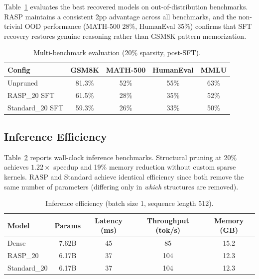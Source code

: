 \documentclass[11pt]{article}
\begin{document}
Table~\ref{tab:extended} evaluates the best recovered models on out-of-distribution benchmarks.
RASP maintains a consistent 2pp advantage across all benchmarks, and the non-trivial OOD performance (MATH-500 28\%, HumanEval 35\%) confirms that SFT recovery restores genuine reasoning rather than GSM8K pattern memorization.

\begin{table}[t]
\centering
\caption{Multi-benchmark evaluation (20\% sparsity, post-SFT).}
\label{tab:extended}
\begin{tabular}{lcccc}
\toprule
\textbf{Config} & \textbf{GSM8K} & \textbf{MATH-500} & \textbf{HumanEval} & \textbf{MMLU} \\
\midrule
Unpruned         & 81.3\% & 52\% & 55\% & 63\% \\
RASP\_20 SFT     & 61.5\% & 28\% & 35\% & 52\% \\
Standard\_20 SFT & 59.3\% & 26\% & 33\% & 50\% \\
\bottomrule
\end{tabular}
\end{table}

\subsection{Inference Efficiency}
\label{sec:efficiency}

Table~\ref{tab:efficiency} reports wall-clock inference benchmarks.
Structural pruning at 20\% achieves $1.22\times$ speedup and 19\% memory reduction without custom sparse kernels.
RASP and Standard achieve identical efficiency since both remove the same number of parameters (differing only in \emph{which} structures are removed).

\begin{table}[t]
\centering
\caption{Inference efficiency (batch size 1, sequence length 512).}
\label{tab:efficiency}
\begin{tabular}{lcccc}
\toprule
\textbf{Model} & \textbf{Params} & \textbf{Latency (ms)} & \textbf{Throughput (tok/s)} & \textbf{Memory (GB)} \\
\midrule
Dense        & 7.62B & 45 & 85  & 15.2 \\
RASP\_20     & 6.17B & 37 & 104 & 12.3 \\
Standard\_20 & 6.17B & 37 & 104 & 12.3 \\
\bottomrule
\end{tabular}
\end{table}
\end{document}
